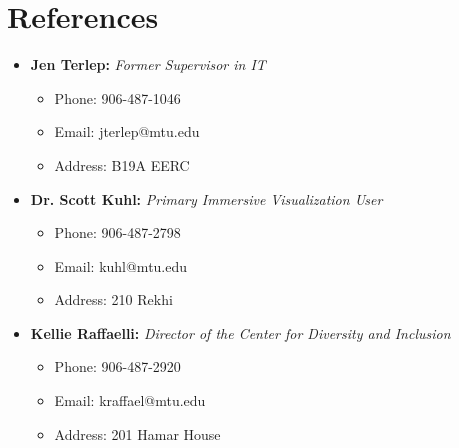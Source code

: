 \documentclass[11pt,a4paper,sans]{moderncv}        %
\begin{document}
\makecvtitle



\section{References}

\vspace{5pt}

\begin{itemize}

\item{\textbf{Jen Terlep:} \textit{Former Supervisor in IT}

\vspace{3pt}

\small{
\begin{itemize}
\item Phone: 906-487-1046
\item Email: jterlep@mtu.edu
\item Address: B19A EERC
\end{itemize}
}}

\vspace{6pt}

\item{\textbf{Dr. Scott Kuhl:} \textit{Primary Immersive Visualization User}

\vspace{3pt}

\small{
\begin{itemize}
\item Phone: 906-487-2798
\item Email: kuhl@mtu.edu
\item Address: 210 Rekhi
\end{itemize}
}}


\vspace{6pt}

\item{\textbf{Kellie Raffaelli:} \textit{Director of the Center for Diversity and Inclusion}

\vspace{3pt}

\small{
\begin{itemize}
\item Phone: 906-487-2920
\item Email: kraffael@mtu.edu
\item Address: 201 Hamar House
\end{itemize}
}}


\end{itemize}
\end{document}

